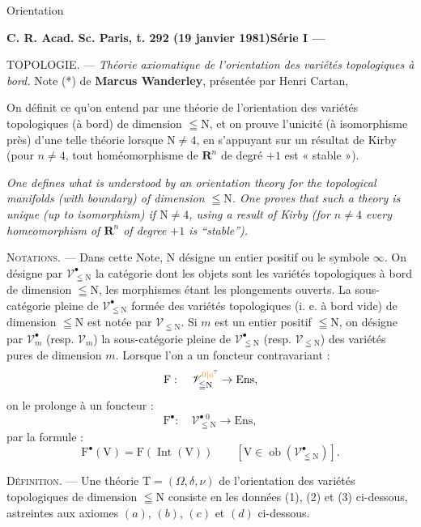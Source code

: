 
Orientation

\textbf{C. R. Acad. Sc. Paris, t. 292 (19 janvier 1981)\hfill Série I --- }

TOPOLOGIE. --- \textit{Théorie axiomatique de l'orientation des variétés topologiques à bord.} Note (*) de \textbf{Marcus Wanderley}, présentée par Henri Cartan,

On définit ce qu'on entend par une théorie de l'orientation des variétés topologiques (à bord) de dimension $\leqq\mathrm{N}$, et on prouve l'unicité (à isomorphisme près) d'une telle théorie lorsque $\mathrm{N}\ne4$, en s'appuyant sur un résultat de Kirby (pour $n\ne4$, tout homéomorphisme de $\mathbf{R}^n$ de degré $+1$ est « stable »).

\textit{One defines what is understood by an orientation theory for the topological manifolds (with boundary) of dimension $\leqq\mathrm{N}$. One proves that such a theory is unique (up to isomorphism) if $\mathrm{N}\ne4$, using a result of Kirby (for $n\ne4$ every homeomorphism of $\mathbf{R}^n$ of degree $+1$ is ``stable'').}

\textsc{Notations}. --- Dans cette Note, $\mathrm{N}$ désigne un entier positif ou le symbole $\infty$. On désigne par $\mathscr{V}^{\bullet}_{\leqq\mathrm{N}}$ la catégorie dont les objets sont les variétés topologiques à bord de dimension $\leqq\mathrm{N}$, les morphismes étant les plongements ouverts. La sous-catégorie pleine de $\mathscr{V}^{\bullet}_{\leqq\mathrm{N}}$ formée des variétés topologiques (i. e. à bord vide) de dimension $\leqq\mathrm{N}$ est notée par $\mathscr{V}_{\leqq\mathrm{N}}$. Si $m$ est un entier positif $\leqq\mathrm{N}$, on désigne par $\mathscr{V}^{\bullet}_m$ (resp. $\mathscr{V}_m$) la sous-catégorie pleine de $\mathscr{V}^{\bullet}_{\leqq\mathrm{N}}$ (resp. $\mathscr{V}_{\leqq\mathrm{N}}$) des variétés pures de dimension $m$. Lorsque l'on a un foncteur contravariant :
\[
\mathrm{F}:\quad\mathscr{V}^{\unsure{0|\mathrm{o}}}_{\leqq\mathrm{N}}\to\mathrm{Ens},
\]
on le prolonge à un foncteur :
\[
\mathrm{F}^{\bullet}:\quad\mathscr{V}^{\bullet\;0}_{\leqq\mathrm{N}}\to\mathrm{Ens},
\]
par la formule :
\[
\mathrm{F}^{\bullet}(\mathrm{V})=\mathrm{F}(\operatorname{Int}(\mathrm{V}))\qquad [\mathrm{V}\in\operatorname{ob}(\mathscr{V}^{\bullet}_{\leqq\mathrm{N}})].
\]

\textsc{Définition}. --- Une théorie $\mathrm{T}=(\Omega,\delta,\nu)$ de l'orientation des variétés topologiques de dimension $\leqq\mathrm{N}$ consiste en les données (1), (2) et (3) ci-dessous, astreintes aux axiomes $(a)$, $(b)$, $(c)$ et $(d)$ ci-dessous.

